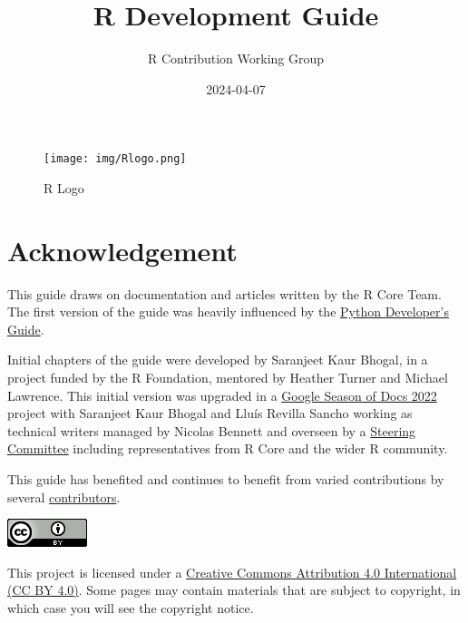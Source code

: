 \documentclass[
]{book}
\title{R Development Guide}
\author{R Contribution Working Group}
\date{2024-04-07}
\begin{document}
\maketitle

{
\setcounter{tocdepth}{1}
\tableofcontents
}
\chapter*{}\label{section}

\begin{figure}
\centering
\texttt{[image: img/Rlogo.png]}
\caption{R Logo}
\end{figure}

\chapter*{Acknowledgement}\label{acknowledgement}

This guide draws on documentation and articles written by the R Core Team. The first version of the guide was heavily influenced by the \href{https://devguide.python.org/}{Python Developer's Guide}.

Initial chapters of the guide were developed by Saranjeet Kaur Bhogal, in a project funded by the R Foundation, mentored by Heather Turner and Michael Lawrence. This initial version was upgraded in a \href{https://github.com/rstats-gsod/gsod2022/wiki/GSOD-2022-Proposal}{Google Season of Docs 2022} project with Saranjeet Kaur Bhogal and Lluís Revilla Sancho working as technical writers managed by Nicolas Bennett and overseen by a \href{https://github.com/rstats-gsod/gsod2022/wiki/GSOD-2022-Proposal\#steering-committee}{Steering Committee} including representatives from R Core and the wider R community.

This guide has benefited and continues to benefit from varied contributions by several \href{https://github.com/r-devel/rdevguide\#contributors-}{contributors}.

\href{https://creativecommons.org/licenses/by/4.0/}{\includegraphics{img/ccby.png}}

This project is licensed under a \href{https://creativecommons.org/licenses/by/4.0/}{Creative Commons Attribution 4.0 International (CC BY 4.0)}. Some pages may contain materials that are subject to copyright, in which case you will see the copyright notice.
\end{document}
